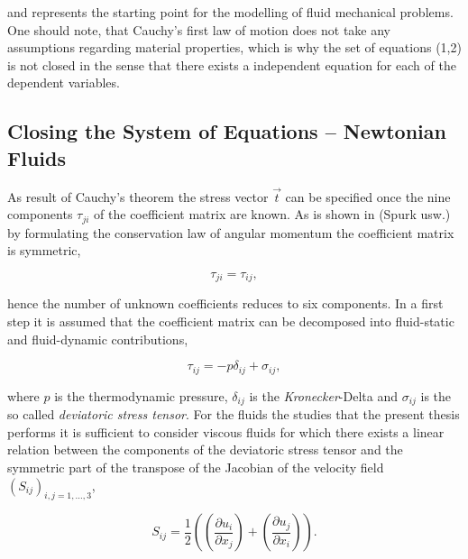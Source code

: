     and represents the starting point for the modelling of fluid mechanical problems. One should note, that Cauchy's first law of motion does not take any assumptions regarding material properties, which is why the set of equations (1,2) is not closed in the sense that there exists a independent equation for each of the dependent variables.

    \subsection{Closing the System of Equations -- Newtonian Fluids}

    As result of Cauchy's theorem the stress vector \( \vec{t} \) can be specified once the nine components \(\tau_{ji}\) of the coefficient matrix are known. As is shown in (Spurk usw.) by formulating the conservation law of angular momentum the coefficient matrix is symmetric, 

    \begin{equation}
      \label{eq:stresssymetry}
      \tau_{ji} = \tau_{ij},
    \end{equation}
    
    hence the number of unknown coefficients reduces to six components. In a first step it is assumed that the coefficient matrix can be decomposed into fluid-static and fluid-dynamic contributions,

    \begin{displaymath}
      \tau_{ij} = -p \delta_{ij} + \sigma_{ij},
    \end{displaymath}

    where \(p\) is the thermodynamic pressure, \(\delta_{ij}\) is the \textit{Kronecker}-Delta and \( \sigma_{ij} \) is the so called \textit{deviatoric stress tensor}. For the fluids the studies that the present thesis performs it is sufficient to consider viscous fluids for which there exists a linear relation between the components of the deviatoric stress tensor and the symmetric part of the transpose of the Jacobian of the velocity field \(\left( S_{ij} \right)_{i,j=1,\dots,3}\),

    \begin{displaymath}
      S_{ij} = \frac{1}{2} \left( \left( \frac{\partial u_i}{\partial x_j} \right) + \left( \frac{\partial u_j}{\partial x_i} \right) \right).
    \end{displaymath}

